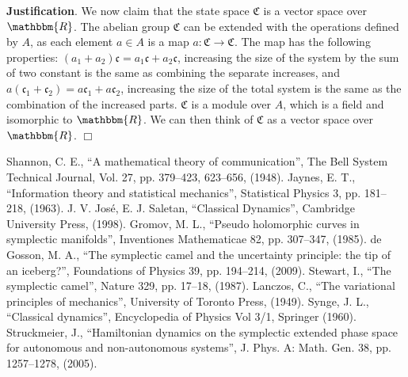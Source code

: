 \documentclass[aps,pra,10pt,twocolumn,floatfix,nofootinbib]{revtex4-1}
\theoremstyle{definition}
\newenvironment{justification}{\textbf{Justification}.}{$\Box$}
\begin{document}
\begin{justification}
We now claim that the state space $\mathfrak{C}$ is a vector space over $\mathbbm{R}$. The abelian group $\mathfrak{C}$ can be extended with the operations defined by $A$, as each element $a \in A$ is a map $a : \mathfrak{C} \rightarrow \mathfrak{C}$. The map has the following properties: $(a_1 + a_2) \mathfrak{c} = a_1 \mathfrak{c} + a_2 \mathfrak{c}$, increasing the size of the system by the sum of two constant is the same as combining the separate increases, and $a (\mathfrak{c}_1 + \mathfrak{c}_2) = a \mathfrak{c}_1 + a \mathfrak{c}_2$, increasing the size of the total system is the same as the combination of the increased parts. $\mathfrak{C}$ is a module over $A$, which is a field and isomorphic to $\mathbbm{R}$. We can then think of $\mathfrak{C}$ as a vector space over $\mathbbm{R}$.
\end{justification}


\begin{thebibliography}{0}

 Shannon, C. E., ``A mathematical theory of communication'', The Bell System Technical Journal, Vol. 27, pp. 379--423, 623--656, (1948).
 Jaynes, E. T., ``Information theory and statistical mechanics'', Statistical Physics 3, pp. 181--218, (1963).
 J. V. Jos\'{e}, E. J. Saletan, ``Classical Dynamics'', Cambridge University Press, (1998).
 Gromov, M. L., ``Pseudo holomorphic curves in symplectic manifolds'', Inventiones Mathematicae 82, pp. 307--347, (1985).
 de Gosson, M. A., ``The symplectic camel and the uncertainty principle: the tip of an iceberg?'', Foundations of Physics 39, pp. 194--214, (2009).
 Stewart, I., ``The symplectic camel'', Nature 329, pp. 17--18, (1987).
 Lanczos, C., ``The variational principles of mechanics'', University of Toronto Press, (1949).
 Synge, J. L., ``Classical dynamics'', Encyclopedia of Physics Vol 3/1, Springer (1960).
 Struckmeier, J., ``Hamiltonian dynamics on the symplectic extended phase space for autonomous and non-autonomous systems'', J. Phys. A: Math. Gen. 38, pp. 1257--1278, (2005).

\end{thebibliography}
\end{document}
